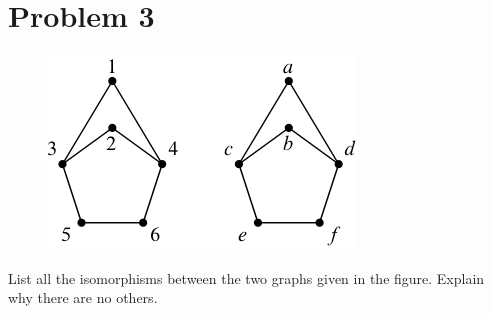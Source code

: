 \documentclass[14pt]{extarticle}
\begin{document}
\section{Problem 3}
\begin{figure}[ht!]
\centering
\includegraphics[scale=0.75]{isom.png}
\end{figure}

List all the isomorphisms between the two graphs given in the figure. Explain why there are no others.
\end{document}

